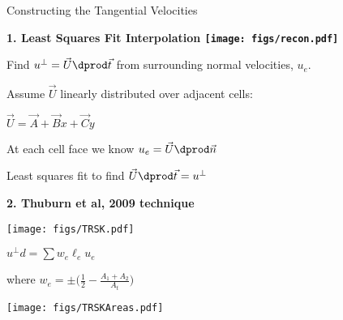 \begin{slide}{Constructing the Tangential Velocities}

\vspace{12pt}
\begin{minipage}[t]{0.45\linewidth}

\begin{center}\bf\large
1. Least Squares Fit Interpolation
\texttt{[image: figs/recon.pdf]}
\end{center}

\begin{list0}
\item Find $u^\perp = \vec{U}\dprod \vec{t}$ from surrounding normal velocities, $u_e$.

\item Assume $\vec{U}$ linearly distributed over adjacent cells:

 $\vec{U} = \vec{A} + \vec{B} x + \vec{C} y$

\item At each cell face we know $u_e = \vec{U}\dprod \vec{n}$

\item Least squares fit to find $\vec{U}\dprod \vec{t} = u^\perp$
\end{list0}
\end{minipage}
\hspace{0.09\linewidth}
\begin{minipage}[t]{0.45\linewidth}\begin{center}

{\bf\large 2. Thuburn et al, 2009 technique}

\texttt{[image: figs/TRSK.pdf]}

\begin{list0}
\item $u^\perp d = \sum w_e \ell_e u_e$

\item where $w_e = \pm \bigl(\frac{1}{2} - \frac{A_1 + A_2}{A_t}\biggr)$
\end{list0}
\texttt{[image: figs/TRSKAreas.pdf]}

\end{center} \end{minipage}

\end{slide}

